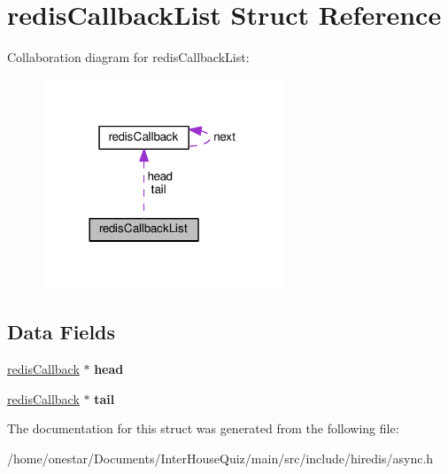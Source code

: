 \hypertarget{structredis_callback_list}{\section{redis\+Callback\+List Struct Reference}
\label{structredis_callback_list}
}


Collaboration diagram for redis\+Callback\+List\+:\nopagebreak
\begin{figure}[H]
\begin{center}
\leavevmode
\includegraphics[width=204pt]{structredis_callback_list__coll__graph}
\end{center}
\end{figure}
\subsection*{Data Fields}
\begin{DoxyCompactItemize}
\item 
\hypertarget{structredis_callback_list_a16cf93c86dd187b0584ecf2a7ce4650a}{\hyperlink{structredis_callback}{redis\+Callback} $\ast$ {\bfseries head}}\label{structredis_callback_list_a16cf93c86dd187b0584ecf2a7ce4650a}

\item 
\hypertarget{structredis_callback_list_ad2ddf51c5bfed7ec5ecc6cac7918ad21}{\hyperlink{structredis_callback}{redis\+Callback} $\ast$ {\bfseries tail}}\label{structredis_callback_list_ad2ddf51c5bfed7ec5ecc6cac7918ad21}

\end{DoxyCompactItemize}


The documentation for this struct was generated from the following file\+:\begin{DoxyCompactItemize}
\item 
/home/onestar/\+Documents/\+Inter\+House\+Quiz/main/src/include/hiredis/async.\+h\end{DoxyCompactItemize}

